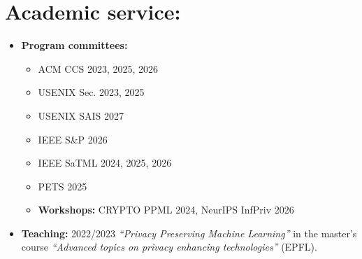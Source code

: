 \documentclass[10pt]{article} %
\begin{document}
\noindent\makebox[\linewidth]{\rule{.2\paperwidth}{0.3pt}}
\section*{Academic service:}  
\begin{itemize}
	\item \textbf{Program committees:}
	\begin{itemize}
		\item ACM CCS 2023, 2025, 2026
		\item USENIX Sec. 2023, 2025
		\item USENIX SAIS 2027
		\item IEEE S\&P 2026
		\item IEEE SaTML 2024, 2025, 2026
		\item PETS 2025
	\end{itemize} 
	\begin{itemize}
		\item \textbf{Workshops:} CRYPTO PPML 2024, NeurIPS InfPriv 2026
	\end{itemize}
	\item \textbf{Teaching:} 2022/2023 \textit{``Privacy Preserving Machine Learning''} in the master's course \textit{``Advanced topics on privacy enhancing technologies''} (EPFL).
\end{itemize}





\end{document}
